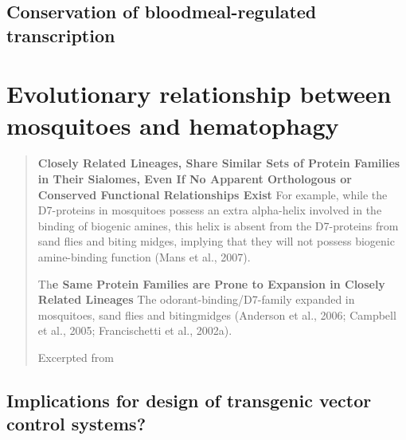 \subsection{Conservation of bloodmeal-regulated transcription}
\dummytext[3]

\section{Evolutionary relationship between mosquitoes and hematophagy}
\begin{quotation}
\textbf{Closely Related Lineages, Share Similar Sets of Protein Families
in Their Sialomes, Even If No Apparent Orthologous or Conserved
Functional Relationships Exist}
For example, while the D7-proteins in mosquitoes possess an extra alpha-helix
involved in the binding of biogenic amines, this helix is absent from the D7-proteins from sand flies and biting midges, implying that they will not possess biogenic amine-binding function (Mans et al., 2007).

Th\textbf{e Same Protein Families are Prone to Expansion in Closely Related Lineages}
The odorant-binding/D7-family expanded in mosquitoes, sand flies and bitingmidges (Anderson et al., 2006; Campbell et al., 2005; Francischetti et al., 2002a).

Excerpted from \cite{Markland2011}
\end{quotation} 

\dummytext[3]

\subsection{Implications for design of transgenic vector control systems?}
\dummytext[3]


